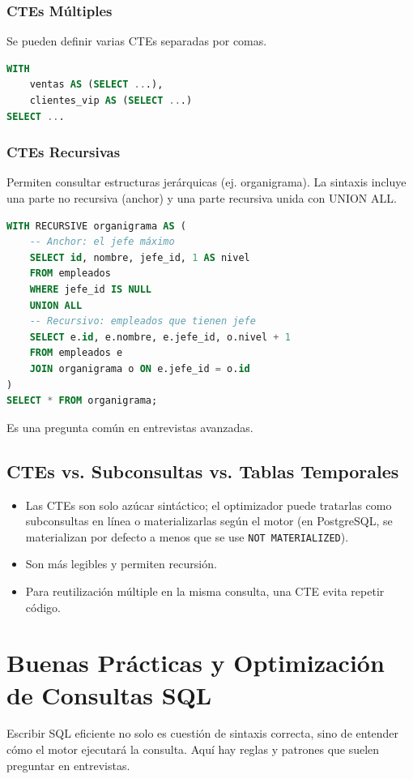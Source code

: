 \documentclass[12pt,a4paper,openany,oneside]{book}
\begin{document}
\subsection{CTEs Múltiples}
Se pueden definir varias CTEs separadas por comas.
\begin{lstlisting}[language=SQL]
WITH
    ventas AS (SELECT ...),
    clientes_vip AS (SELECT ...)
SELECT ...
\end{lstlisting}

\subsection{CTEs Recursivas}
Permiten consultar estructuras jerárquicas (ej. organigrama). La sintaxis incluye una parte no recursiva (anchor) y una parte recursiva unida con UNION ALL.
\begin{lstlisting}[language=SQL]
WITH RECURSIVE organigrama AS (
    -- Anchor: el jefe máximo
    SELECT id, nombre, jefe_id, 1 AS nivel
    FROM empleados
    WHERE jefe_id IS NULL
    UNION ALL
    -- Recursivo: empleados que tienen jefe
    SELECT e.id, e.nombre, e.jefe_id, o.nivel + 1
    FROM empleados e
    JOIN organigrama o ON e.jefe_id = o.id
)
SELECT * FROM organigrama;
\end{lstlisting}
Es una pregunta común en entrevistas avanzadas.

\section{CTEs vs. Subconsultas vs. Tablas Temporales}
\begin{itemize}
    \item Las CTEs son solo azúcar sintáctico; el optimizador puede tratarlas como subconsultas en línea o materializarlas según el motor (en PostgreSQL, se materializan por defecto a menos que se use \texttt{NOT MATERIALIZED}).
    \item Son más legibles y permiten recursión.
    \item Para reutilización múltiple en la misma consulta, una CTE evita repetir código.
\end{itemize}

\chapter{Buenas Prácticas y Optimización de Consultas SQL}
Escribir SQL eficiente no solo es cuestión de sintaxis correcta, sino de entender cómo el motor ejecutará la consulta. Aquí hay reglas y patrones que suelen preguntar en entrevistas.
\end{document}
